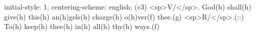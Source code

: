 initial-style: 1;
centering-scheme: english;
(c3) <sp>V/</sp>. God(h) shall(h) give(h) this(h) an(h)gels(h) charge(h) o(h)ver(f) thee.(g) <sp>R/</sp>.(::)
To(h) keep(h) thee(h) in(h) all(h) thy(h) ways.(f)
